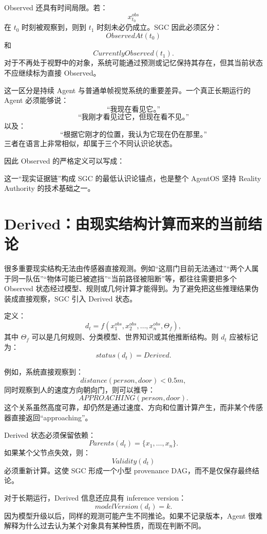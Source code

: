 Observed 还具有时间局限。若：
\[
x_{t_0}^{obs}
\]
在 $t_0$ 时刻被观察到，则到 $t_1$ 时刻未必仍成立。SGC 因此必须区分：
\[
ObservedAt(t_0)
\]
和
\[
CurrentlyObserved(t_1).
\]
对于不再处于视野中的对象，系统可能通过预测或记忆保持其存在，但其当前状态不应继续标为直接 Observed。

这一区分是持续 Agent 与普通单帧视觉系统的重要差异。一个真正长期运行的 Agent 必须能够说：
\[
\text{“我现在看见它。”}
\]
\[
\text{“我刚才看见过它，但现在看不见。”}
\]
以及：
\[
\text{“根据它刚才的位置，我认为它现在仍在那里。”}
\]
三者在语言上非常相似，却属于三个不同认识论状态。

因此 Observed 的严格定义可以写成：
\begin{statementbox}
\centering
{}
\end{statementbox}
这一“现实证据链”构成 SGC 的最低认识论锚点，也是整个 AgentOS 坚持 Reality Authority 的技术基础之一。

\section{Derived：由现实结构计算而来的当前结论}

很多重要现实结构无法由传感器直接观测。例如“这扇门目前无法通过”“两个人属于同一队伍”“物体可能已被遮挡”“当前路径被阻断”等，都往往需要把多个 Observed 状态经过模型、规则或几何计算才能得到。为了避免把这些推理结果伪装成直接观察，SGC 引入 Derived 状态。

定义：
\[
d_t
=
f(
x_1^{obs},
x_2^{obs},
\ldots,
x_n^{obs},
\Theta_f
),
\]
其中 $\Theta_f$ 可以是几何规则、分类模型、世界知识或其他推断结构。则 $d_t$ 应被标记为：
\[
status(d_t)=Derived.
\]

例如，系统直接观察到：
\[
distance(person,door)<0.5m,
\]
同时观察到人的速度方向朝向门，则可以推导：
\[
APPROACHING(person,door).
\]
这个关系虽然高度可靠，却仍然是通过速度、方向和位置计算产生，而非某个传感器直接返回“approaching”。

Derived 状态必须保留依赖：
\[
Parents(d_t)=\{x_1,\ldots,x_n\}.
\]
如果某个父节点失效，则：
\[
Validity(d_t)
\]
必须重新计算。这使 SGC 形成一个小型 provenance DAG，而不是仅保存最终结论。

对于长期运行，Derived 信息还应具有 inference version：
\[
modelVersion(d_t)=k.
\]
因为模型升级以后，同样的观测可能产生不同推论。如果不记录版本，Agent 很难解释为什么过去认为某个对象具有某种性质，而现在判断不同。

